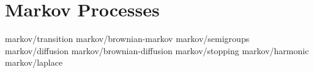 \chapter	{Markov Processes}

	{markov/transition}
	{markov/brownian-markov}
	{markov/semigroups}
	{markov/diffusion}
	{markov/brownian-diffusion}
	{markov/stopping}
	{markov/harmonic}
	{markov/laplace}

